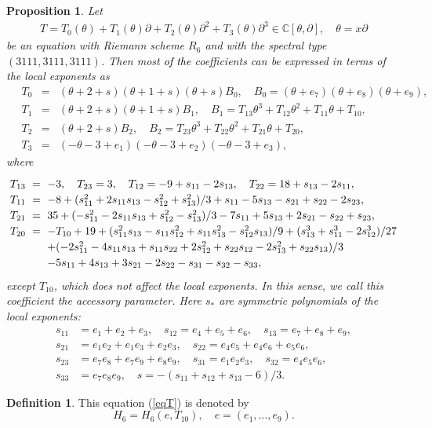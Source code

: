 \documentclass[a4paper,12pt]{article}
\newtheorem{prp}[thm]{Proposition}
\theoremstyle{definition}
\newtheorem{dfn}[thm]{Definition}
\theoremstyle{remark}
\numberwithin{equation}{section} %
\newcommand{\blue}[1]{\textcolor{black}{#1}}
\begin{document}
\begin{prp}\label{eqwithR6}Let
  \begin{eqnarray}\label{eqT}T=T_0(\theta)+T_1(\theta)\partial+T_2(\theta)\partial^2+T_3(\theta)\partial^3\in\mathbb{C}[\theta,\partial],\quad \theta=x\partial\end{eqnarray}
be an equation with Riemann scheme $R_6$ and with the spectral type $(3111,3111,3111)$. Then most \blue{of the} coefficients can be expressed in terms of the local exponents as
{\setlength\arraycolsep{2pt} \def\arraystretch{1.1}
  \begin{eqnarray} 
\quad T_0&=&(\theta+2+s)(\theta+1+s)(\theta+s)B_0,\quad B_0=(\theta+e_7)(\theta+e_8)(\theta+e_9), \label{eqT0}\\
\quad      T_1&=&(\theta+2+s)(\theta+1+s)B_1,\quad B_1=T_{13}\theta^3+T_{12}\theta^2+T_{11}\theta+T_{10}, \label{eqT1}\\
\quad    T_2&=&(\theta+2+s)B_2,\quad B_2=T_{23}\theta^3+T_{22}\theta^2+T_{21}\theta+T_{20}, \label{eqT2}\\
\quad    T_3&=&(-\theta-3+e_1)(-\theta-3+e_2)(-\theta-3+e_3), \label{eqT3}
  \end{eqnarray}
  }
where
\[\def\arraystretch{1.2}\setlength\arraycolsep{3pt} \begin{array}{rcl}
  T_{13}&=&-3,\quad T_{23}=3,\quad  T_{12}=-9+s_{11}-2s_{13},\quad  T_{22}=18+s_{13}-2s_{11},\\
T_{11}&=&-8+(s_{11}^2+2s_{11}s_{13}-s_{12}^2+s_{13}^2)/3+s_{11}-5s_{13}-s_{21}+s_{22}-2s_{23},\\
T_{21}&=&35+(-s_{11}^2-2s_{11}s_{13}+s_{12}^2-s_{13}^2)/3-7s_{11}+5s_{13}+2s_{21}-s_{22}+s_{23},\\
%
T_{20}&=&-T_{10}+19+(s_{11}^2s_{13}-s_{11}s_{12}^2+s_{11}s_{13}^2-s_{12}^2s_{13})/9+(s_{13}^3+s_{11}^3-2s_{12}^3)/27\\
&&+(-2s_{11}^2-4s_{11}s_{13}+s_{11}s_{22}+2s_{12}^2+s_{22}s_{12}-2s_{13}^2+s_{22}s_{13})/3\\
&&
-5s_{11}+4s_{13}+3s_{21}-2s_{22}-s_{31}-s_{32}-s_{33},
\end{array}
\]
except $T_{10}$, which does not affect the local exponents. In this sense, we call this coefficient the {\rm accessory parameter}.
Here $s_*$ are symmetric polynomials of the local exponents:
\def\arraystretch{1.1}\setlength\arraycolsep{1pt}
\begin{equation}\label{e19tos}\begin{array}{rl}      %
s_{11}&=e_1+e_2+e_3,\quad s_{12}=e_4+e_5+e_6,\quad s_{13}=e_7+e_8+e_9,\\
s_{21}&=e_1e_2+e_1e_3+e_2e_3,\quad s_{22}=e_4e_5+e_4e_6+e_5e_6,\\ 
s_{23}&=e_7e_8+e_7e_9+e_8e_9,\quad s_{31}=e_1e_2e_3,\quad s_{32}=e_4e_5e_6,\\ 
s_{33}& = e_7e_8e_9,\quad s=-(s_{11}+s_{12}+s_{13}-6)/3.
\end{array}\end{equation}
\setlength\arraycolsep{3pt}
\end{prp}
\begin{dfn}This equation (\ref{eqT}) is denoted by
  $$H_6=H_6(e,T_{10}),\quad e=(e_1,\dots,e_9).$$
  \end{dfn}
\end{document}
